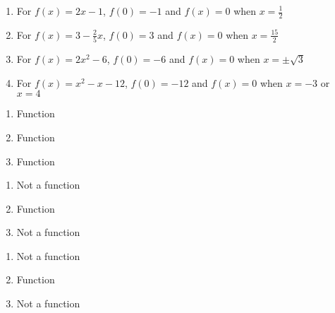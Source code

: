 \documentclass{ximera}
\begin{document}
\begin{enumerate}
\setcounter{enumi}{\value{HW}}

\item For $f(x) = 2x-1$,  $f(0) = -1$ and $f(x) = 0$ when $x = \frac{1}{2}$

\item For $f(x) =  3 - \frac{2}{5} x$, $f(0) = 3$ and $f(x) = 0$ when $x = \frac{15}{2}$

\item For $f(x) =  2x^2-6$, $f(0) = -6$ and $f(x) = 0$ when $x = \pm \sqrt{3}$

\item For $f(x) =  x^2-x-12$, $f(0) = -12$ and $f(x) = 0$ when $x = -3$ or $x=4$


\setcounter{HW}{\value{enumi}}
\end{enumerate}

\begin{multicols}{3}
\begin{enumerate}
\setcounter{enumi}{\value{HW}}


\item Function
\item Function
\item Function

\setcounter{HW}{\value{enumi}}
\end{enumerate}
\end{multicols}

\begin{multicols}{3}
\begin{enumerate}
\setcounter{enumi}{\value{HW}}


\item Not a function
\item Function
\item Not a function

\setcounter{HW}{\value{enumi}}
\end{enumerate}
\end{multicols}

\begin{multicols}{3}
\begin{enumerate}
\setcounter{enumi}{\value{HW}}

\item  Not a function
\item  Function
\item  Not a function

\setcounter{HW}{\value{enumi}}
\end{enumerate}
\end{multicols}
\end{document}
